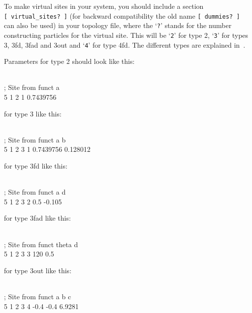 To make virtual sites in your system, you should include a section
{\tt [~virtual\_sites?~]} (for backward compatibility the old name
{\tt [~dummies?~]} can also be used) in your topology file,
where the `{\tt ?}' stands
for the number constructing particles for the virtual site. This will be
`{\tt 2}' for type 2, `{\tt 3}' for types 3, 3fd, 3fad and 3out and
`{\tt 4}' for type 4fd.  The different types are explained
in~.

Parameters for type 2 should look like this:\\
{\small\begin{tt}
 \\
; Site  from        funct  a \\
5       1     2     1      0.7439756\\
\end{tt}}

for type 3 like this:\\
{\small\begin{tt}
\\
; Site  from               funct   a          b\\
5       1     2     3      1       0.7439756  0.128012\\
\end{tt}}

for type 3fd like this:\\
{\small\begin{tt}
\\
; Site  from               funct   a          d\\
5       1     2     3      2       0.5        -0.105\\
\end{tt}}

for type 3fad like this:\\
{\small\begin{tt}
\\
; Site  from               funct   theta      d\\
5       1     2     3      3       120        0.5\\
\end{tt}}

for type 3out like this:\\
{\small\begin{tt}
\\
; Site  from               funct   a          b          c\\
5       1     2     3      4       -0.4       -0.4       6.9281\\
\end{tt}}

